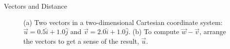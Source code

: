\documentclass{beamer}
\begin{document}
\begin{frame}{Vectors and Distance}
\begin{figure}
\centering
{}
\caption{\label{fig:twovectors3} (a) Two vectors in a two-dimensional Cartesian coordinate system: $\vec{u} = 0.5\hat{i}+1.0\hat{j}$ and $\vec{v} = 2.0\hat{i}+1.0\hat{j}$.  (b) To compute $\vec{w}-\vec{v}$, arrange the vectors to get a sense of the result, $\vec{u}$.}
\end{figure}
\end{frame}
\end{document}
